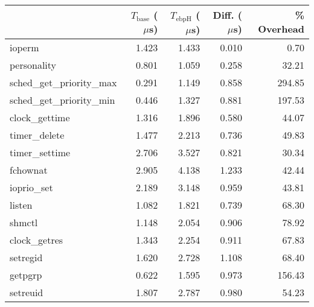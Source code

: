 \begin{tabular}{>{\ttfamily}lrrrr}
\toprule
\multicolumn{1}{l}{System Call} & $T_\text{base}$ ($\mu$s) & $T_\text{ebpH}$ ($\mu$s) & Diff. ($\mu$s) & \% Overhead \\
\midrule
                         ioperm &                    1.423 &                    1.433 &          0.010 &        0.70 \\
                    personality &                    0.801 &                    1.059 &          0.258 &       32.21 \\
      sched\_get\_priority\_max &                    0.291 &                    1.149 &          0.858 &      294.85 \\
      sched\_get\_priority\_min &                    0.446 &                    1.327 &          0.881 &      197.53 \\
                 clock\_gettime &                    1.316 &                    1.896 &          0.580 &       44.07 \\
                  timer\_delete &                    1.477 &                    2.213 &          0.736 &       49.83 \\
                 timer\_settime &                    2.706 &                    3.527 &          0.821 &       30.34 \\
                       fchownat &                    2.905 &                    4.138 &          1.233 &       42.44 \\
                    ioprio\_set &                    2.189 &                    3.148 &          0.959 &       43.81 \\
                         listen &                    1.082 &                    1.821 &          0.739 &       68.30 \\
                         shmctl &                    1.148 &                    2.054 &          0.906 &       78.92 \\
                  clock\_getres &                    1.343 &                    2.254 &          0.911 &       67.83 \\
                       setregid &                    1.620 &                    2.728 &          1.108 &       68.40 \\
                        getpgrp &                    0.622 &                    1.595 &          0.973 &      156.43 \\
                       setreuid &                    1.807 &                    2.787 &          0.980 &       54.23 \\

\end{tabular}

